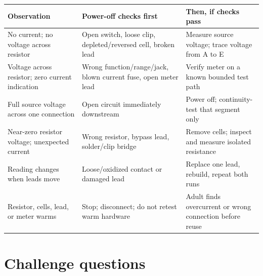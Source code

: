 \begin{tabularx}{\linewidth}{@{}>{\raggedright\arraybackslash}p{.22\linewidth} L L@{}}
\toprule
Observation & Power-off checks first & Then, if checks pass\\
\midrule
No current; no voltage across resistor &
Open switch, loose clip, depleted/reversed cell, broken lead &
Measure source voltage; trace voltage from A to E\\
Voltage across resistor; zero current indication &
Wrong function/range/jack, blown current fuse, open meter lead &
Verify meter on a known bounded test path\\
Full source voltage across one connection &
Open circuit immediately downstream &
Power off; continuity-test that segment only\\
Near-zero resistor voltage; unexpected current &
Wrong resistor, bypass lead, solder/clip bridge &
Remove cells; inspect and measure isolated resistance\\
Reading changes when leads move &
Loose/oxidized contact or damaged lead &
Replace one lead, rebuild, repeat both runs\\
Resistor, cells, lead, or meter warms &
Stop; disconnect; do not retest warm hardware &
Adult finds overcurrent or wrong connection before reuse\\
\bottomrule
\end{tabularx}

\section{Challenge questions}

